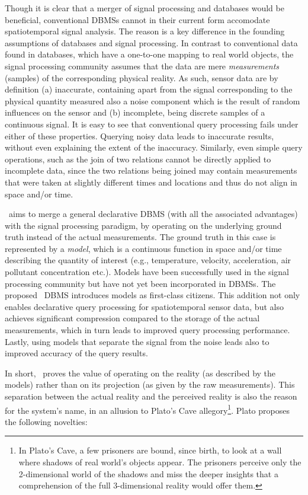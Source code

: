 Though it is clear that a merger of signal processing and databases would be beneficial, conventional DBMSs cannot in their current form accomodate spatiotemporal signal analysis. The reason is a key difference in the founding assumptions of databases and signal processing. In contrast to conventional data found in databases, which have a one-to-one mapping to real world objects, the signal processing community assumes that the data are mere {\em measurements} (samples) of the corresponding physical reality.
As such, sensor data are by definition (a) inaccurate, containing apart from the signal corresponding to the physical quantity measured also a noise component which is the result of random influences on the sensor and (b) incomplete, being discrete samples of a continuous signal. It is easy to see that conventional query processing fails under either of these properties. Querying noisy data leads to inaccurate results, without even explaining the extent of the inaccuracy. Similarly, even simple query operations, such as the join of two relations cannot be directly applied to incomplete data, since the two relations being joined may contain measurements that were taken at slightly different times and locations and thus do not align in space and/or time.

\projName\ aims to merge a general declarative DBMS (with all the associated advantages) with the signal processing paradigm, by operating on the underlying ground truth instead of the actual measurements. The ground truth in this case is represented by a {\em model}, which is a continuous function in space and/or time describing the quantity of interest (e.g., temperature, velocity, acceleration, air pollutant concentration etc.). Models have been successfully used in the signal processing community but have not yet been incorporated in DBMSs. The proposed \projName\ DBMS introduces models as first-class citizens. This addition not only enables declarative query processing for spatiotemporal sensor data, but also achieves significant compression compared to the storage of the actual measurements, which in turn leads to improved query processing performance. Lastly, using models that separate the signal from the noise leads also to improved accuracy of the query results. %

In short, \projName\ proves the value of operating on the reality (as described by the models) rather than on its projection (as given by the raw measurements). This separation between the actual reality and the perceived reality is also the reason for the system's name, in an allusion to Plato's Cave allegory\footnote{In Plato's Cave, a few prisoners are bound, since birth, to look at a wall where shadows of real world's objects appear. The prisoners perceive only the 2-dimensional world of the shadows and miss the deeper insights that a comprehension of the full 3-dimensional reality would offer them.
}.
%
Plato proposes the following novelties:

